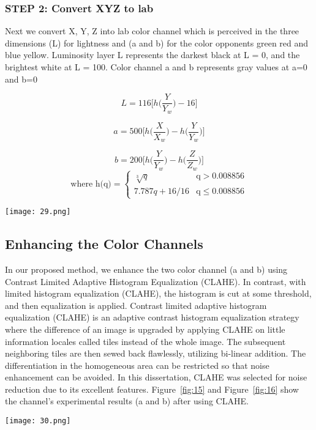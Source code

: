 \documentclass[doctor,english,listoffigures,listoftables]{thesis-uestc}
\begin{document}
\subsubsection{STEP 2: Convert XYZ to lab}
Next we convert X, Y, Z  into lab color channel which is perceived in the three dimensions (L) for lightness and (a and b) for the color opponents green red and blue yellow. Luminosity layer L represents the darkest black at L = 0, and the brightest white at L = 100. Color channel a and b represents gray values at a=0 and b=0
\[\]

\begin{equation} L=116\bigg[h\bigg(\frac{Y}{Y_w}\bigg)-16\bigg] \end{equation} 

\begin{equation}a=500 \bigg[h\bigg(\frac{X}{X_w}\bigg)- h\bigg(\frac{Y}{Y_w}\biggl)\biggl]\end{equation}

\begin{equation}b=200 \bigg[h\bigg(\frac{Y}{Y_w}\bigg)- h\bigg(\frac{Z}{Z_w}\bigg)\bigg]\end{equation} 
\begin{equation}\text{where h(q)}=
\begin{cases}
\sqrt[3]{q} &\text{q} > 0.008856\\
7.787q+16/16 &\text{q}  \leqslant 0.008856
\end{cases}
\end{equation}

\begin{figure*}
	\centering
	\texttt{[image: 29.png]}
	\caption{Block diagram of lab color channel.}
	\label{fig:14}
\end{figure*}

\subsection{Enhancing the Color Channels}
In our proposed method, we enhance the two color channel (a and b) using Contrast Limited Adaptive Histogram Equalization (CLAHE). In contrast, with limited histogram equalization (CLAHE), the histogram is cut at some threshold, and then equalization is applied. Contrast limited adaptive histogram equalization (CLAHE) is an adaptive contrast histogram equalization strategy where the difference of an image is upgraded by applying CLAHE on little information locales called tiles instead of the whole image. The subsequent neighboring tiles are then sewed back flawlessly, utilizing bi-linear addition. The differentiation in the homogeneous area can be restricted so that noise enhancement can be avoided. In this dissertation, CLAHE was selected for noise reduction due to its excellent features. Figure~\ref{fig:15} and Figure~\ref{fig:16} show the channel's experimental results (a and b) after using CLAHE. 
\begin{figure*}[!htb]
	\centering
	\texttt{[image: 30.png]}
	\caption{Results of Color Channel a}
	\label{fig:15}
\end{figure*}
\end{document}
